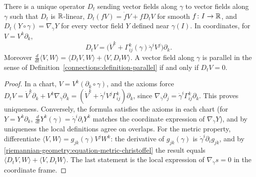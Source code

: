 \begin{proposition}\label{riemannian-geometry:proposition-covariant-derivative-curves}
There is a unique operator $D_t$ sending vector fields along $\gamma$ to vector fields along $\gamma$ such that $D_t$ is $\mathbb{R}$-linear, $D_t(fV) = \dot fV + fD_tV$ for smooth $f \colon I \to \mathbb{R}$, and
$D_t(Y \circ \gamma) = \nabla_{\dot\gamma}Y$ for every vector field $Y$ defined near $\gamma(I)$. In coordinates, for $V = V^k\partial_k$,
\[
D_tV = \big(\dot V^k + \Gamma^k_{ij}(\gamma)\dot\gamma^iV^j\big)\partial_k.
\]
Moreover $\frac{d}{dt}\langle V, W\rangle = \langle D_tV, W\rangle + \langle V, D_tW\rangle$. A vector field along $\gamma$ is parallel in the sense of Definition~\ref{connections:definition-parallel} if and only if $D_tV = 0$.
\end{proposition}

\begin{proof}
In a chart, $V = V^k(\partial_k \circ \gamma)$, and the axioms force $D_tV = \dot V^k\partial_k + V^k\nabla_{\dot\gamma}\partial_k = (\dot V^k + \dot\gamma^iV^j\Gamma^k_{ij})\partial_k$, since $\nabla_{\dot\gamma}\partial_j = \dot\gamma^i\Gamma^k_{ij}\partial_k$. This
proves uniqueness. Conversely, the formula satisfies the axioms in each chart (for $Y = Y^k\partial_k$, $\frac{d}{dt}Y^k(\gamma) = \dot\gamma^i\partial_iY^k$ matches the coordinate expression of $\nabla_{\dot\gamma}Y$), and by uniqueness the
local definitions agree on overlaps. For the metric property, differentiate $\langle V, W\rangle = g_{jk}(\gamma)V^jW^k$: the derivative of $g_{jk}(\gamma)$ is $\dot\gamma^i\partial_ig_{jk}$, and by \eqref{riemannian-geometry:equation-metric-christoffel} the result equals
$\langle D_tV, W\rangle + \langle V, D_tW\rangle$. The last statement is the local expression of $\nabla_{\dot\gamma}s = 0$ in the coordinate frame.
\end{proof}

